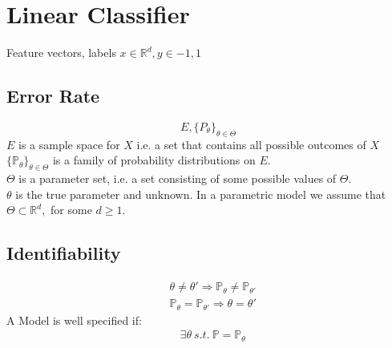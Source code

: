\section{Linear Classifier}

Feature vectors, labels
$x \in \mathbb{R}^d, y \in {-1,1}$

\subsection{Error Rate}
\[E, \{ P_\theta \} _{\theta \in \Theta }\]
$E$ is a sample space for $X$ i.e. a set that contains all possible outcomes of $X$\\
$\displaystyle \{ \mathbb {P_\theta }\} _{\theta \in \Theta }$ is a family of probability distributions on $E$.\\
$\Theta$ is a parameter set, i.e. a set consisting of some possible values of $\Theta$.\\
$\theta$ is the true parameter and unknown. In a parametric model we assume that $\Theta \subset \mathbb{R}^d,$ for some $d \geq 1$.
\subsection{Identifiability}
\begin{align*}
&\theta \neq \theta' \Rightarrow \mathbb{P}_{\theta} \neq \mathbb{P}_{\theta'}\\
&\mathbb{P}_{\theta} = \mathbb{P}_{\theta'} \Rightarrow \theta = \theta'
\end{align*}
A Model is well specified if:
\begin{align*}
&\exists \theta \ s.t.\ \mathbb{P} =\mathbb{P}_{\theta }
\end{align*}